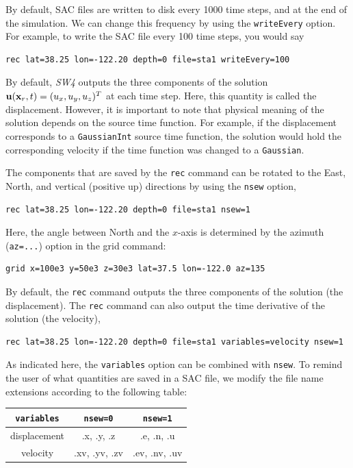 \documentclass[11pt]{report}
\newcommand{\ub}{{\bf u}}
\newcommand{\xb}{{\bf x}}
\begin{document}
By default, SAC files are written to disk every 1000 time steps, and at the end of the
simulation. We can change this frequency by using the {\tt writeEvery} option. For example, to
write the SAC file every 100 time steps, you would say
\begin{verbatim}
rec lat=38.25 lon=-122.20 depth=0 file=sta1 writeEvery=100
\end{verbatim}


By default, \emph{SW4} outputs the three components of the solution $\ub(\xb_r,t)=(u_x,u_y,u_z)^T$
at each time step. Here, this quantity is called the displacement. However, it is
important to note that physical meaning of the solution depends on the source time function. For
example, if the displacement corresponds to a \verb+GaussianInt+ source time function, the solution
would hold the corresponding velocity if the time function was changed to a \verb+Gaussian+.

The components that are saved by the \verb+rec+ command can be rotated to the East, North, and vertical
(positive up) directions by using the \verb+nsew+ option,
\begin{verbatim}
rec lat=38.25 lon=-122.20 depth=0 file=sta1 nsew=1
\end{verbatim}
Here, the angle between North and the $x$-axis is determined by the azimuth ({\tt az=...}) option in
the grid command:
\begin{verbatim}
grid x=100e3 y=50e3 z=30e3 lat=37.5 lon=-122.0 az=135
\end{verbatim}
By default, the \verb+rec+ command outputs the three components of the solution (the displacement). The
\verb+rec+ command can also output the time derivative of the solution (the velocity),
\begin{verbatim}
rec lat=38.25 lon=-122.20 depth=0 file=sta1 variables=velocity nsew=1
\end{verbatim}
As indicated here, the \verb+variables+ option can be combined with \verb+nsew+.  To remind the user
of what quantities are saved in a SAC file, we modify the file name extensions according to the
following table:
\begin{center}
\begin{tabular}{|c|c|c|} \hline
\verb+variables+  & \verb+nsew=0+ & \verb+nsew=1+ \\ \hline\hline
displacement & .x, .y, .z    & .e, .n, .u  \\ \hline
velocity     & .xv, .yv, .zv & .ev, .nv, .uv  \\ \hline
\end{tabular}
\end{center}
\end{document}
